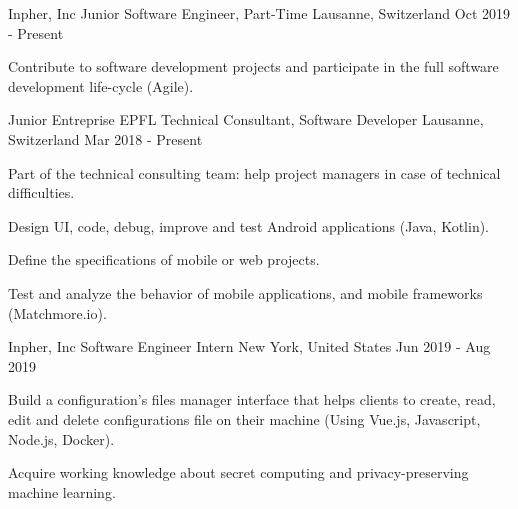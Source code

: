 

\begin{cventries}

  \cventry
    {Inpher, Inc} %
    {Junior Software Engineer, Part-Time} %
    {Lausanne, Switzerland} %
    {Oct 2019 - Present} %
    {
      \begin{cvitems} %
        \item {Contribute to software development projects and participate in the full software development life-cycle (Agile).}
      \end{cvitems}
    }
    
\cventry
    {Junior Entreprise EPFL} %
    {Technical Consultant, Software Developer} %
    {Lausanne, Switzerland} %
    {Mar 2018 - Present} %
    {
      \begin{cvitems} %
        \item {Part of the technical consulting team: help project managers in case of technical difficulties.}
        \item Design UI, code, debug, improve and test Android applications (Java, Kotlin).
        \item {Define the specifications of mobile or web projects.}
        \item {Test and analyze the behavior of mobile applications, and mobile frameworks (Matchmore.io).}
      \end{cvitems}
    }
    
  \cventry
    {Inpher, Inc} %
    {Software Engineer Intern} %
    {New York, United States} %
    {Jun 2019 - Aug 2019} %
    {
      \begin{cvitems} %
        \item {Build a configuration's files manager interface that helps clients to create, read, edit and delete configurations file on their machine (Using Vue.js, Javascript, Node.js, Docker).}
        \item {Acquire working knowledge about secret computing and privacy-preserving machine learning.}
      \end{cvitems}
    }
    
\end{cventries}
